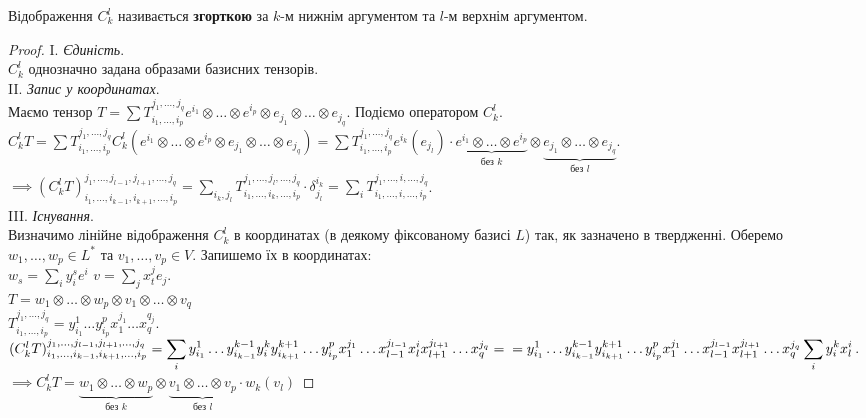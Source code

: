\documentclass{math_library}
\begin{document}
\begin{proposition}
Відображення $C_k^l$ називається \textbf{згорткою} за $k$-м нижнім аргументом та $l$-м верхнім аргументом.
\end{proposition}

\begin{proof}
I. \textit{Єдиність}.\\
$C_k^l$ однозначно задана образами базисних тензорів.
\bigskip \\
II. \textit{Запис у координатах}.\\
Маємо тензор $T = \displaystyle\sum T_{i_1,\dots,i_p}^{j_1,\dots,j_q} e^{i_1} \otimes \dots \otimes e^{i_p} \otimes e_{j_1} \otimes \dots \otimes e_{j_q}$. Подіємо оператором $C_k^l$.\\
$C_k^l T = \displaystyle\sum T_{i_1,\dots,i_p}^{j_1,\dots,j_q} C_k^l(e^{i_1} \otimes \dots \otimes e^{i_p} \otimes e_{j_1} \otimes \dots \otimes e_{j_q}) = \sum T_{i_1,\dots,i_p}^{j_1,\dots,j_q} e^{i_k}(e_{j_l}) \cdot \underbrace{e^{i_1} \otimes \dots \otimes e^{i_p}}_{\text{без }k} \otimes \underbrace{e_{j_1} \otimes \dots \otimes e_{j_q}}_{\text{без }l}$.\\
$\implies (C_k^l T)_{i_1,\dots,i_{k-1},i_{k+1},\dots,i_p}^{j_1,\dots,j_{l-1},j_{l+1},\dots,j_q} = \displaystyle\sum_{i_k,j_l} T_{i_1,\dots,i_k,\dots,i_p}^{j_1,\dots,j_l,\dots,j_q} \cdot \delta_{j_l}^{i_k} = \sum_{i} T_{i_1,\dots,i,\dots,i_p}^{j_1,\dots,i,\dots,j_q}$.
\bigskip \\
III. \textit{Існування}.\\
Визначимо лінійне відображення $C_k^l$ в координатах (в деякому фіксованому базисі $L$) так, як зазначено в твердженні. Оберемо $w_1,\dots,w_p \in L^*$ та $v_1,\dots,v_p \in V$. Запишемо їх в координатах:\\
$w_s = \displaystyle\sum_i y_i^s e^i$ \qquad $v = \displaystyle\sum_j x^j_t e_j$.\\
$T = w_1 \otimes \dots \otimes w_p \otimes v_1 \otimes \dots \otimes v_q$\\
$T_{i_1,\dots,i_p}^{j_1,\dots,j_q} = y_{i_1}^1 \dots y_{i_p}^p x_1^{j_1} \dots x_q^{q_j}$.\\
$(C_k^l T)_{i_1,\dots,i_{k-1},i_{k+1},\dots,i_p}^{j_1,\dots,j_{l-1},j_{l+1},\dots,j_q} = \displaystyle\sum_i y_{i_1}^1 \dots y_{i_{k-1}}^{k-1} y_i^k y_{i_{k+1}}^{k+1} \dots y_{i_p}^p x_1^{j_1} \dots x_{l-1}^{j_{l-1}} x_l^i x_{l+1}^{j_{l+1}} \dots x_q^{j_q} = \\
= y_{i_1}^1 \dots y_{i_{k-1}}^{k-1} y_{i_{k+1}}^{k+1} \dots y_{i_p}^p x_1^{j_1} \dots x_{l-1}^{j_{l-1}} x_{l+1}^{j_{l+1}} \dots x_q^{j_q} \sum_i y_i^k x_l^i$.\\
$\implies C_k^l T = \underbrace{w_1 \otimes \dots \otimes w_p}_{\text{без }k} \otimes \underbrace{v_1 \otimes \dots \otimes v_p}_{\text{без }l} \cdot w_k(v_l)$
\end{proof}

\newpage
\fi
\end{document}
